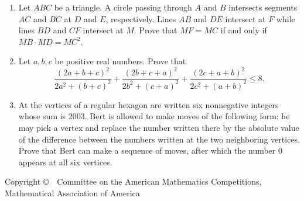 \documentclass[12pt]{article}
\def\be{\begin{enumerate}}
\def\ee{\end{enumerate}}
\def\ii{\item}
\begin{document}
\be
\ii [4.]
Let $ABC$ be a triangle. A circle passing through $A$ and $B$
intersects segments $AC$ and $BC$ at $D$ and $E$, respectively.
Lines $AB$ and $DE$ intersect at $F$ while lines $BD$ and $CF$
intersect at $M$. Prove that $MF = MC$ if and only if $MB\cdot MD
= MC^2$.


\ii [5.]
Let $a, b, c$ be positive real numbers. Prove that
\[
\frac{(2a+b+c)^2}{2a^2+(b+c)^2} + \frac{(2b+c+a)^2}{2b^2+(c+a)^2} +
\frac{(2c+a+b)^2}{2c^2+(a+b)^2} \le 8.
\]

\ii [6.]
At the vertices of a regular hexagon are written six nonnegative
integers whose sum is 2003. Bert is allowed to make moves of the
following form: he may pick a vertex and replace the number
written there by the absolute value of the difference between the
numbers written at the two neighboring vertices. Prove that Bert
can make a sequence of moves, after which the number 0 appears at
all six vertices.

\vfill

\ee
{\small
\begin{center}
Copyright \copyright \ \ Committee on the American  Mathematics  Competitions,\\
Mathematical Association of America
\end{center}
}
\end{document}
